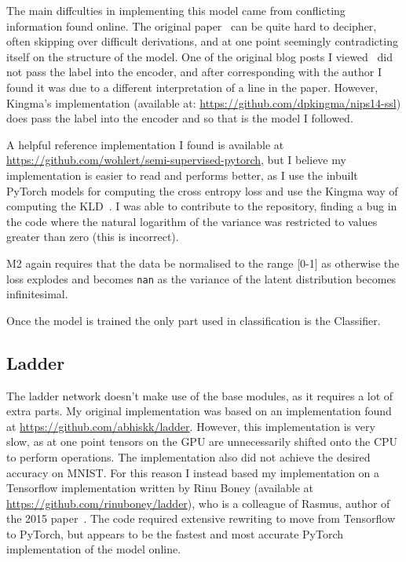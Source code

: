 The main diffculties in implementing this model came from conflicting information found online. 
The original paper~\cite{DBLP:journals/corr/KingmaRMW14} can be quite hard to decipher, often skipping over difficult derivations, and 
at one point seemingly contradicting itself on the structure of the model.
One of the original blog posts I viewed~\cite{Semisupe95:online} did not pass the label into the 
encoder, and after corresponding with the author I found it was due to a different interpretation of a line in the paper. However,
Kingma's implementation (available at: \url{https://github.com/dpkingma/nips14-ssl}) does pass the label into the encoder and so that is the 
model I followed. 

A helpful reference implementation I found is available at \url{https://github.com/wohlert/semi-supervised-pytorch}, but I believe my implementation is 
easier to read and performs better, as I use the inbuilt PyTorch models for computing the cross entropy loss and use the Kingma way 
of computing the KLD~\cite{DBLP:journals/corr/KingmaW13}. I was able to contribute to the repository, finding a bug in the 
code where the natural logarithm of the variance was restricted to values greater than zero (this is incorrect).

M2 again requires that the data be normalised to the range [0-1] as otherwise the loss explodes and becomes 
\texttt{nan} as the variance of the latent distribution becomes infinitesimal.

Once the model is trained the only part used in classification is the Classifier.

\subsection{Ladder} \label{ladder_imp}

The ladder network doesn't make use of the base modules, as it requires a lot of extra parts. My original implementation 
was based on an implementation found at \url{https://github.com/abhiskk/ladder}. However, this implementation is very slow, as at one point 
tensors on the GPU are unnecessarily shifted onto the CPU to perform operations. The implementation also did 
not achieve the desired accuracy on MNIST. For this reason I instead based my implementation on a Tensorflow implementation written by 
Rinu Boney
(available at \url{https://github.com/rinuboney/ladder}), who is a colleague of Rasmus, author of
the 2015 paper~\cite{DBLP:journals/corr/RasmusVHBR15}. The code required extensive rewriting to move from Tensorflow to PyTorch,
but appears to be the fastest and most accurate PyTorch implementation of the model online.

